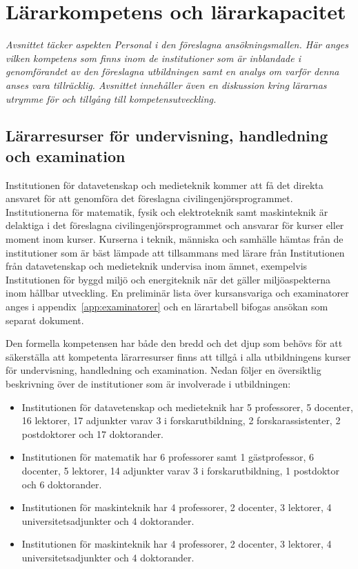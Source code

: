 \chapter{Lärarkompetens och lärarkapacitet\label{ch:personal}}

\begin{tcbdoublebox}
\emph{Avsnittet täcker aspekten Personal i den föreslagna ansökningsmallen. Här anges vilken kompetens som finns inom de institutioner som är inblandade i genomförandet av den föreslagna utbildningen samt en analys om varför denna anses vara tillräcklig. Avsnittet innehåller även en diskussion kring lärarnas utrymme för och tillgång till kompetensutveckling.}
\end{tcbdoublebox}

\section{Lärarresurser för undervisning, handledning och examination}

Institutionen för datavetenskap och medieteknik kommer att få det direkta ansvaret för att genomföra det föreslagna civilingenjörsprogrammet. Institutionerna för matematik, fysik och elektroteknik samt maskinteknik är delaktiga i det föreslagna civilingenjörsprogrammet och ansvarar för kurser eller moment inom kurser. Kurserna i teknik, människa och samhälle hämtas från de institutioner som är bäst lämpade att tillsammans med lärare från Institutionen från datavetenskap och medieteknik undervisa inom ämnet, exempelvis Institutionen för byggd miljö och energiteknik när det gäller miljöaspekterna inom hållbar utveckling. En preliminär lista över kursansvariga och examinatorer anges i appendix~\ref{app:examinatorer} och en lärartabell bifogas ansökan som separat dokument.

Den formella kompetensen har både den bredd och det djup som behövs för att säkerställa att kompetenta lärarresurser finns att tillgå i alla utbildningens kurser för undervisning, handledning och examination. Nedan följer en översiktlig beskrivning över de institutioner som är involverade i utbildningen:

\begin{itemize}
	\item Institutionen för datavetenskap och medieteknik har 5 professorer, 5 docenter, 16 lektorer, 17 adjunkter varav 3 i forskarutbildning, 2 forskarassistenter, 2 postdoktorer och 17 doktorander.
	\item  Institutionen för matematik har 6 professorer samt 1 gästprofessor, 6 docenter, 5 lektorer, 14 adjunkter varav 3 i forskarutbildning, 1 postdoktor och 6 doktorander.
	\item  Institutionen för maskinteknik har 4 professorer, 2 docenter, 3 lektorer, 4 universitetsadjunkter och 4 doktorander.
	\item Institutionen för maskinteknik har 4 professorer, 2 docenter, 3 lektorer, 4 universitetsadjunkter och 4 doktorander.
\end{itemize}

